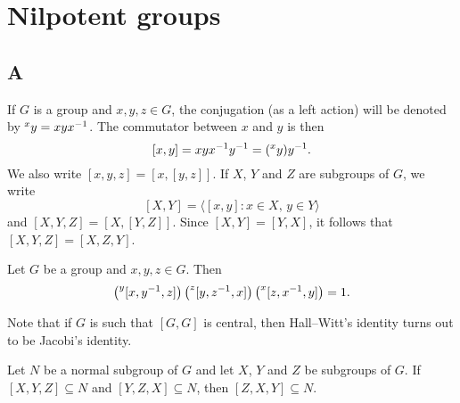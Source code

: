 \chapter{Nilpotent groups}
\label{nilpotent}

\section*{A}

If $G$ is a group and $x,y,z\in G$, the conjugation (as a left action) will be denoted
by $\prescript{x}{}y=xyx^{-1}$. The commutator between $x$ and $y$ is then 
\[
[x,y]=xyx^{-1}y^{-1}=(\prescript{x}{}y)y^{-1}.
\]
We also write 
$[x,y,z]=[x,[y,z]]$. 
If $X$, $Y$ and $Z$ are subgroups of $G$, we write 
\[
[X,Y]=\langle [x,y]:x\in X,\,y\in Y\rangle
\]
and $[X,Y,Z]=\left[ X,[Y,Z] \right]$. Since $[X,Y]=[Y,X]$, it follows that  
$[X,Y,Z]=[X,Z,Y]$. 

\begin{exercise}
	\label{xca:HallWitt}
	Let $G$ be a group and $x,y,z\in G$. Then 
	\begin{equation}
		\label{eq:HallWitt}
	\left(\prescript{y}{}[x,y^{-1},z]\right)\left(\prescript{z}{}[y,z^{-1},x]\right)\left(\prescript{x}{}[z,x^{-1},y]\right)=1.
	\end{equation}
\end{exercise}

Note that if $G$ is such that $[G,G]$ is central, then Hall--Witt's identity 
turns out to be Jacobi's identity. 

%

\begin{lemma}
	\label{lemma:3subgrupos_general}
	Let $N$ be a normal subgroup of $G$ and let $X$, $Y$ and $Z$
	be subgroups of $G$. If $[X,Y,Z]\subseteq N$ and $[Y,Z,X]\subseteq N$, then 
	$[Z,X,Y]\subseteq N$.
\end{lemma}

